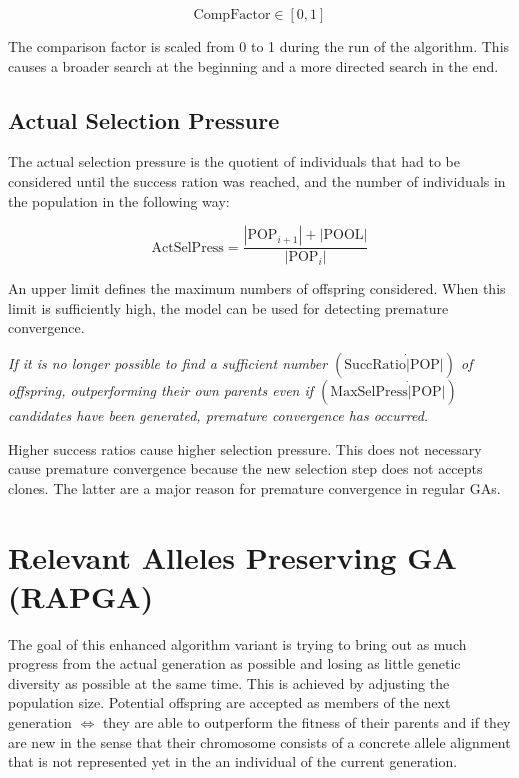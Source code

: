 \documentclass[../main.tex]{subfiles}
\begin{document}
\begin{equation}
    \text{CompFactor} \in [0,1]
\end{equation}

The comparison factor is scaled from 0 to 1 during the run of the algorithm. This causes a broader search at the beginning and a more directed search in the end.

\subsection{Actual Selection Pressure}
The actual selection pressure is the quotient of individuals that had to be considered until the success ration was reached, and the number of individuals in the population in the following way:

\begin{equation}
    \text{ActSelPress} = \frac{ | \text{POP}_{i+1} | + | \text{POOL} | }{ | \text{POP}_i | }
\end{equation}

An upper limit defines the maximum numbers of offspring considered. When this limit is sufficiently high, the model can be used for detecting premature convergence.

\textit{If it is no longer possible to find a sufficient number $(\text{SuccRatio} \dot | \text{POP} |)$ of offspring, outperforming their own parents even if $(\text{MaxSelPress} \dot | \text{POP} |)$ candidates have been generated, premature convergence has occurred.}

Higher success ratios cause higher selection pressure. This does not necessary cause premature convergence because the new selection step does not accepts clones. The latter are a major reason for premature convergence in regular GAs.

\section{Relevant Alleles Preserving GA (RAPGA)}

The goal of this enhanced algorithm variant is trying to bring out as much progress from the actual generation as possible and losing as little genetic diversity as possible at the same time. This is achieved by adjusting the population size. Potential offspring are accepted as members of the next generation $\Leftrightarrow $ they are able to outperform the fitness of their parents and if they are new in the sense that their chromosome consists of a concrete allele alignment that is not represented yet in the  an individual of the current generation.
\end{document}
